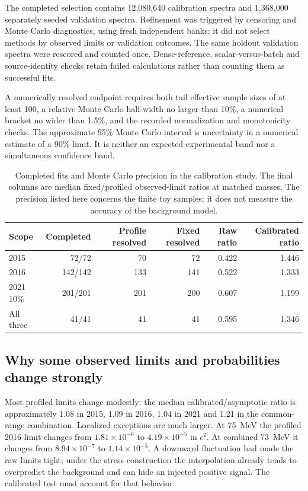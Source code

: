 The completed selection contains 12,080,640 calibration spectra and
1,368,000 separately seeded validation spectra. Refinement was triggered
by censoring and Monte Carlo diagnostics, using fresh independent banks;
it did not select methods by observed limits or validation outcomes.
The same holdout validation spectra were rescored and counted once.
Dense-reference, scalar-versus-batch and source-identity checks retain
failed calculations rather than counting them as successful fits.

A numerically resolved endpoint requires both tail effective sample
sizes of at least 100, a relative Monte Carlo half-width no larger than 10\%,
a numerical bracket no wider than 1.5\%, and the recorded normalization
and monotonicity checks. The approximate 95\% Monte Carlo interval is
uncertainty in a numerical estimate of a 90\% limit. It is neither an
expected experimental band nor a simultaneous confidence band.

\begin{table}[htbp]\centering\small
\begin{tabular}{lrrrrr}\toprule
Scope & Completed & Profile resolved & Fixed resolved & Raw ratio & Calibrated ratio\\\midrule
2015 & 72/72 & 70 & 72 & 0.422 & 1.446\\
2016 & 142/142 & 133 & 141 & 0.522 & 1.333\\
2021 10\% & 201/201 & 201 & 200 & 0.607 & 1.199\\
All three & 41/41 & 41 & 41 & 0.595 & 1.346\\\bottomrule
\end{tabular}
\caption{Completed fits and Monte Carlo precision in the calibration study.
The final columns are median fixed/profiled observed-limit ratios at
matched masses. The precision listed here concerns the finite toy samples;
it does not measure the accuracy of the background model.}
\label{v5-tab:calibration-summary}
\end{table}

\subsection{Why some observed limits and probabilities change strongly}
Most profiled limits change modestly: the median calibrated/asymptotic
ratio is approximately 1.08 in 2015, 1.09 in 2016, 1.04 in 2021 and 1.21
in the common-range combination. Localized exceptions are much larger.
At 75~MeV the profiled 2016 limit changes from $1.81\times10^{-6}$ to
$4.19\times10^{-5}$ in $\epsilon^2$. At combined 73~MeV it changes from
$8.94\times10^{-7}$ to $1.14\times10^{-5}$. A downward fluctuation had
made the raw limits tight; under the stress construction the interpolation
already tends to overpredict the background and can hide an injected
positive signal. The calibrated test must account for that behavior.

